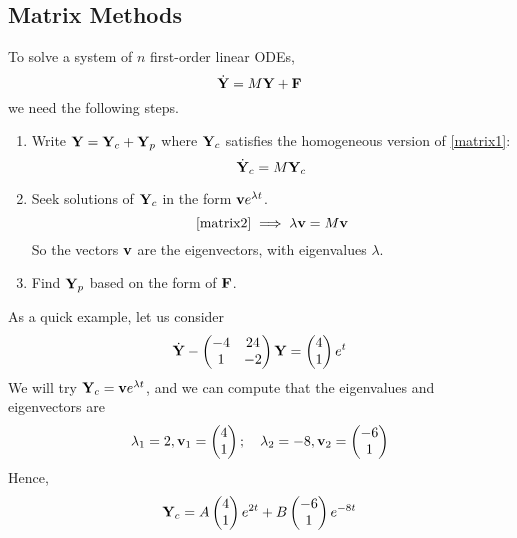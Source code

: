 \subsection{Matrix Methods}
To solve a system of \(n\) first-order linear ODEs,
\begin{equation}\label{matrix1}
	\dot {\vb Y} = M\vb Y + \vb F
\end{equation}
we need the following steps.
\begin{enumerate}
	\item Write \(\vb Y = \vb Y_c + \vb Y_p\) where \(\vb Y_c\) satisfies the homogeneous version of \eqref{matrix1}:
	      \begin{equation}\label{matrix2}
		      \dot {\vb Y}_c = M\vb Y_c
	      \end{equation}
	\item Seek solutions of \(\vb Y_c\) in the form \(\vb v e^{\lambda t}\).
	      \[
		      \eqref{matrix2} \implies \lambda \vb v = M\vb v
	      \]
	      So the vectors \(\vb v\) are the eigenvectors, with eigenvalues \(\lambda\).
	\item Find \(\vb Y_p\) based on the form of \(\vb F\).
\end{enumerate}
As a quick example, let us consider
\begin{equation}\label{matrixexample}
	\dot {\vb Y} - \begin{pmatrix}
		-4 & 24 \\ 1 & -2
	\end{pmatrix}\vb Y = \begin{pmatrix}
		4 \\ 1
	\end{pmatrix}e^t
\end{equation}
We will try \(\vb Y_c = \vb v e^{\lambda t}\), and we can compute that the eigenvalues and eigenvectors are
\[
	\lambda_1 = 2, \vb v_1 = \begin{pmatrix}
		4 \\ 1
	\end{pmatrix};\quad \lambda_2 = -8, \vb v_2 = \begin{pmatrix}
		-6 \\ 1
	\end{pmatrix}
\]
Hence,
\[
	\vb Y_c = A\begin{pmatrix}
		4 \\ 1
	\end{pmatrix}e^{2t} + B\begin{pmatrix}
		-6 \\ 1
	\end{pmatrix}e^{-8t}
\]
